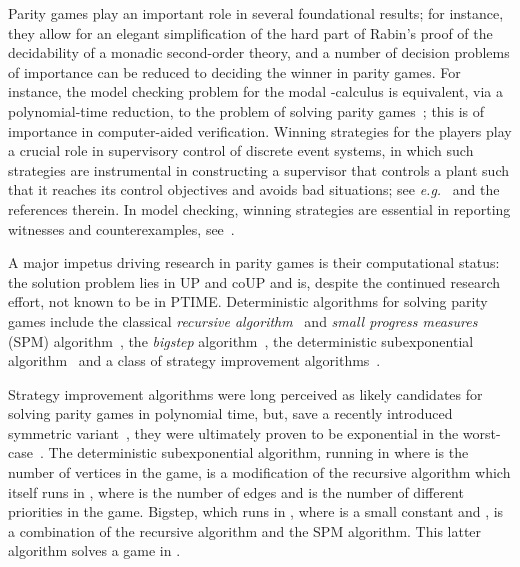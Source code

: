 \documentclass{eptcs}
\newcommand{\eg}{\emph{e.g.}\xspace}
\begin{document}
Parity games play an important role in several foundational results;
for instance, they allow for an elegant simplification of the hard
part of Rabin's proof of the decidability of a monadic second-order
theory, and a number of decision problems of importance can be
reduced to deciding the winner in parity games. For instance, the
model checking problem for the modal -calculus is equivalent,
via a polynomial-time reduction, to the problem of solving parity
games~\cite{EJS:93,SS:98}; this is of importance in computer-aided
verification.  Winning strategies for the players play a crucial
role in supervisory control of discrete event systems, in which
such strategies are instrumental in constructing a supervisor that
controls a plant such that it reaches its control objectives and
avoids bad situations; see \eg~\cite{AVW:03} and the references
therein. In model checking, winning strategies are essential in
reporting witnesses and counterexamples, see~\cite{SS:98}.\medskip

A major impetus driving research in parity games is their computational
status: the solution problem lies in UP and coUP and is, despite
the continued research effort, not known to be in PTIME.  
Deterministic algorithms for solving parity games include the
classical \emph{recursive algorithm}~\cite{Zie:98} and
\emph{small progress measures} (SPM) algorithm~\cite{Jur:00}, the
\emph{bigstep} algorithm~\cite{Sch:07}, the deterministic subexponential
algorithm~\cite{JPZ:06} and a class of strategy improvement
algorithms~\cite{VJ:00,Sch:08,Fea:10}.

Strategy improvement algorithms were long perceived as likely
candidates for solving parity games in polynomial time, but, save
a recently introduced symmetric variant~\cite{STV:15}, they were
ultimately proven to be exponential in the worst-case~\cite{Fri:11}.
The deterministic subexponential algorithm, running in 
where  is the number of vertices in the game, is a modification
of the recursive algorithm which
itself runs in , where  is the number of edges
and  is the number of different priorities in the game. Bigstep,
which runs in , where 
is a small constant and , is a combination
of the recursive algorithm and 
the SPM algorithm.
This latter algorithm solves a game in .
\end{document}
